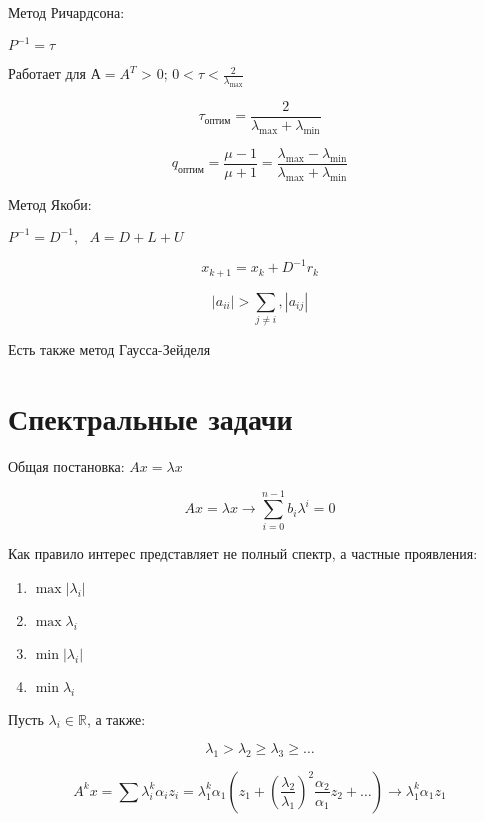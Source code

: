 \documentclass[10pt,a4paper]{article}
\begin{document}
		Метод Ричардсона:
		
		$P^{-1} = \tau$
		
		Работает для $А = A^{T}$ > 0; $0 < \tau < \frac{2}{\lambda_{\max}}$
		
		$$\tau_{\text{оптим}} = \frac{2}{\lambda_{\max} + \lambda_{\min}}$$
		
		$$q_{\text{оптим}} = \frac{\mu - 1}{\mu + 1} = \frac{\lambda_{\max} -
		 \lambda_{\min}}{\lambda_{\max} + \lambda_{\min}}$$
		 
		Метод Якоби:
		 
		$P^{-1} = D^{-1}, \ \ \ A = D + L + U$
		
		$$x_{k + 1} = x_{k} + D^{-1}r_{k}$$
		
		$$\left|a_{ii}\right| > \sum\limits_{j\neq i}, \left|a_{ij}\right|$$
		
		Есть также метод Гаусса-Зейделя
		
		\newpage	
			
		\section{Спектральные задачи}
		
		Общая постановка: $Ax = \lambda x$
		
		\begin{equation*}
			Ax = \lambda x \rightarrow \sum\limits_{i = 0}^{n - 1}b_{i}
			\lambda^{i} = 0
		\end{equation*}
		
		Как правило интерес представляет не полный спектр, а частные проявления:
		
		\begin{enumerate}
			\item $\max \left|\lambda_{i}\right|$
			\item $\max\lambda_{i}$
			\item $\min \left|\lambda_{i}\right|$
			\item $\min \lambda_{i}$
		\end{enumerate}
		
		Пусть $\lambda_{i} \in \mathbb{R}$, а также:
		
		\begin{equation}
			\lambda_{1} > \lambda_{2} \geqslant \lambda_{3} \geqslant \ldots
		\end{equation}
		
		\begin{equation}
			A^{k} x = \sum \lambda_{i}^{k}\alpha_{i}z_{i} = 
			\lambda_{1}^{k}\alpha_{1}\left(z_{1} + 
			\left(\frac{\lambda_{2}}{\lambda_{1}}\right)^{2}
			\frac{\alpha_{2}}{\alpha_{1}} z_{2} + \ldots\right)
			\rightarrow \lambda_{1}^{k}\alpha_{1}z_{1}
		\end{equation}
		
\end{document}
